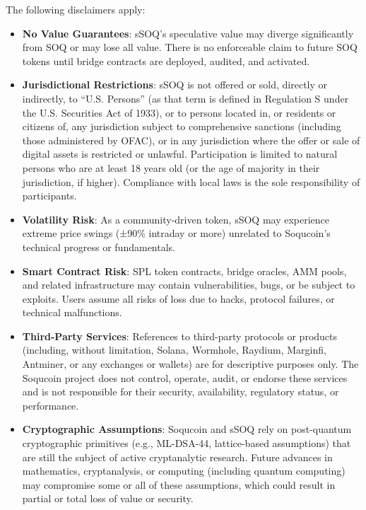 \documentclass[10pt]{article}
\begin{document}
The following disclaimers apply:

\begin{itemize}
    \item \textbf{No Value Guarantees}: sSOQ's speculative value may diverge significantly from SOQ or may lose all value. There is no enforceable claim to future SOQ tokens until bridge contracts are deployed, audited, and activated.
    \item \textbf{Jurisdictional Restrictions}: sSOQ is not offered or sold, directly or indirectly, to ``U.S. Persons'' (as that term is defined in Regulation S under the U.S. Securities Act of 1933), or to persons located in, or residents or citizens of, any jurisdiction subject to comprehensive sanctions (including those administered by OFAC), or in any jurisdiction where the offer or sale of digital assets is restricted or unlawful. Participation is limited to natural persons who are at least 18 years old (or the age of majority in their jurisdiction, if higher). Compliance with local laws is the sole responsibility of participants.
    \item \textbf{Volatility Risk}: As a community-driven token, sSOQ may experience extreme price swings (±90\% intraday or more) unrelated to Soqucoin's technical progress or fundamentals.
    \item \textbf{Smart Contract Risk}: SPL token contracts, bridge oracles, AMM pools, and related infrastructure may contain vulnerabilities, bugs, or be subject to exploits. Users assume all risks of loss due to hacks, protocol failures, or technical malfunctions.
    \item \textbf{Third-Party Services}: References to third-party protocols or products (including, without limitation, Solana, Wormhole, Raydium, Marginfi, Antminer, or any exchanges or wallets) are for descriptive purposes only. The Soqucoin project does not control, operate, audit, or endorse these services and is not responsible for their security, availability, regulatory status, or performance.
    \item \textbf{Cryptographic Assumptions}: Soqucoin and sSOQ rely on post-quantum cryptographic primitives (e.g., ML-DSA-44, lattice-based assumptions) that are still the subject of active cryptanalytic research. Future advances in mathematics, cryptanalysis, or computing (including quantum computing) may compromise some or all of these assumptions, which could result in partial or total loss of value or security.
\end{itemize}
\end{document}
